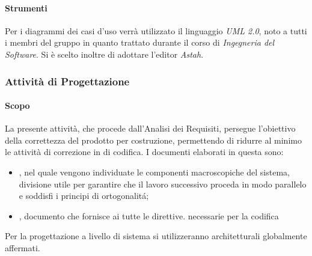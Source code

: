 			\paragraph*{Strumenti}
				Per i diagrammi dei casi d'uso verrà utilizzato il linguaggio \textit{UML 2.0},
				noto a tutti i membri del gruppo in quanto trattato durante il corso
				di \textit{Ingegneria del Software}.
				Si \`e scelto inoltre di adottare l'editor  \textit{Astah}.   %
			
			
		\subsubsection{Attività di Progettazione}
			\paragraph*{Scopo}
		        La presente attivit\`a, che procede dall'Analisi dei Requisiti, persegue l'obiettivo
		        della correttezza del prodotto per costruzione, permettendo di ridurre al minimo le attività di correzione
		        in  di codifica.
                        I documenti elaborati in questa  sono:
                        \begin{itemize}
                        \item {}, nel quale vengono individuate le componenti macroscopiche del sistema,
                          divisione utile per garantire che il lavoro successivo proceda in modo parallelo e soddisfi i principi di ortogonalit\'a;
                        \item {}, documento che fornisce ai  tutte le direttive. necessarie per la codifica
                        \end{itemize}
		        Per la progettazione a livello di sistema si utilizzeranno  architetturali globalmente affermati.
                 
